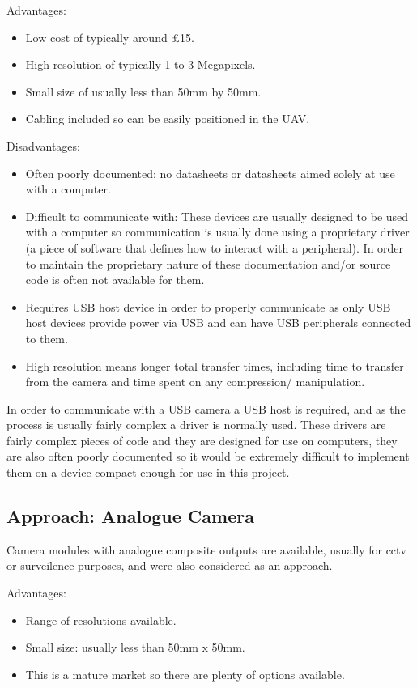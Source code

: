 Advantages:
      \begin{itemize}
         \item Low cost of typically around \pounds 15.
         \item High resolution of typically 1 to 3 Megapixels.
		 \item Small size of usually less than 50mm by 50mm.
		 \item Cabling included so can be easily positioned in the UAV.
     \end{itemize}

Disadvantages:
\begin{itemize}
     \item Often poorly documented: no datasheets or datasheets aimed solely at use with a computer.
     \item Difficult to communicate with: These devices are usually designed to be used with a computer so communication is usually done using a proprietary driver (a piece of software that defines how to interact with a peripheral). In order to maintain the proprietary nature of these documentation and/or source code is often not available for them.
    \item Requires USB host device in order to properly communicate as only USB host devices provide power via USB and can have USB peripherals connected to them.
	\item High resolution means longer total transfer times, including time to transfer from the camera and time spent on any compression/ manipulation.
\end{itemize}

In order to communicate with a USB camera a USB host is required, and as the process is usually fairly complex a driver is normally used. These drivers are fairly complex pieces of code and they are designed for use on computers, they are also often poorly documented so it would be extremely difficult to implement them on a device compact enough for use in this project.

\subsection{Approach: Analogue Camera}
\label{sec:Analog_option}

Camera modules with analogue composite outputs are available, usually for cctv or surveilence purposes, and were also considered as an approach.

Advantages:
\begin{itemize}
	\item Range of resolutions available.
	\item Small size: usually less than 50mm x 50mm.
	\item This is a mature market so there are plenty of options available.
\end{itemize}

